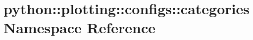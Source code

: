 \hypertarget{namespacepython_1_1plotting_1_1configs_1_1categories}{
\section{python::plotting::configs::categories Namespace Reference}
\label{namespacepython_1_1plotting_1_1configs_1_1categories}
}

